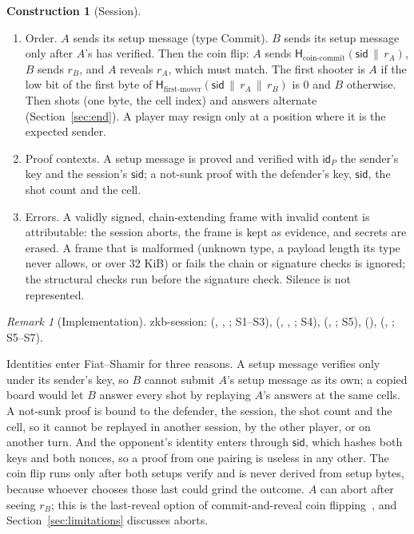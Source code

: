 \documentclass[11pt]{article}
\theoremstyle{definition}
\newtheorem{construction}[lemma]{Construction}
\theoremstyle{remark}
\newtheorem{remark}[lemma]{Remark}
\newcommand{\sid}{\mathsf{sid}}
\newcommand{\id}{\mathsf{id}}
\begin{document}
\begin{construction}[Session]
\begin{enumerate}[label=S\arabic*.]
  \item Order. $A$ sends its setup message (type Commit). $B$ sends its setup message only after $A$'s has verified. Then the coin flip: $A$ sends $\mathsf H_{\mathrm{coin\text{-}commit}}(\sid\,\|\,r_A)$, $B$ sends $r_B$, and $A$ reveals $r_A$, which must match. The first shooter is $A$ if the low bit of the first byte of $\mathsf H_{\mathrm{first\text{-}mover}}(\sid\,\|\,r_A\,\|\,r_B)$ is $0$ and $B$ otherwise. Then shots (one byte, the cell index) and answers alternate (Section~\ref{sec:end}). A player may resign only at a position where it is the expected sender.
  \item Proof contexts. A setup message is proved and verified with $\id_P$ the sender's key and the session's $\sid$; a not-sunk proof with the defender's key, $\sid$, the shot count and the cell.
  \item Errors. A validly signed, chain-extending frame with invalid content is attributable: the session aborts, the frame is kept as evidence, and secrets are erased. A frame that is malformed (unknown type, a payload length its type never allows, or over 32 KiB) or fails the chain or signature checks is ignored; the structural checks run before the signature check. Silence is not represented.
\end{enumerate}
\end{construction}

\begin{remark}[Implementation]\label{rem:impl-session}
zkb-session:  (, , ; S1--S3),  (, , ; S4),  (, ; S5),  (),  (, ; S5--S7).
\end{remark}

Identities enter Fiat--Shamir for three reasons. A setup message verifies only under its sender's key, so $B$ cannot submit $A$'s setup message as its own; a copied board would let $B$ answer every shot by replaying $A$'s answers at the same cells. A not-sunk proof is bound to the defender, the session, the shot count and the cell, so it cannot be replayed in another session, by the other player, or on another turn. And the opponent's identity enters through $\sid$, which hashes both keys and both nonces, so a proof from one pairing is useless in any other. The coin flip runs only after both setups verify and is never derived from setup bytes, because whoever chooses those last could grind the outcome. $A$ can abort after seeing $r_B$; this is the last-reveal option of commit-and-reveal coin flipping~\cite{blum-coin}, and Section~\ref{sec:limitations} discusses aborts.
\end{document}
